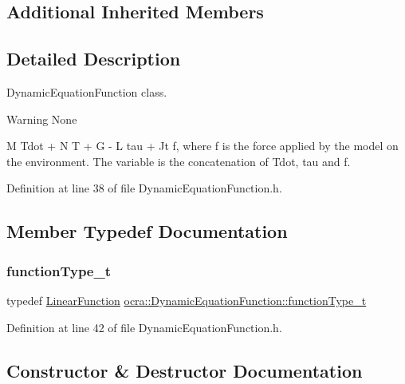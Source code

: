 \subsection*{Additional Inherited Members}


\subsection{Detailed Description}
Dynamic\+Equation\+Function class. 

\begin{DoxyWarning}{Warning}
None
\end{DoxyWarning}
M Tdot + N T + G -\/ L tau + Jt f, where f is the force applied by the model on the environment. The variable is the concatenation of Tdot, tau and f. 

Definition at line 38 of file Dynamic\+Equation\+Function.\+h.



\subsection{Member Typedef Documentation}
\hypertarget{classocra_1_1DynamicEquationFunction_a2c8c76bfd66285d63895ec34219175b4}{}\label{classocra_1_1DynamicEquationFunction_a2c8c76bfd66285d63895ec34219175b4} 
\subsubsection{\texorpdfstring{function\+Type\+\_\+t}{functionType\_t}}
{\footnotesize\ttfamily typedef \hyperlink{classocra_1_1LinearFunction}{Linear\+Function} \hyperlink{classocra_1_1DynamicEquationFunction_a2c8c76bfd66285d63895ec34219175b4}{ocra\+::\+Dynamic\+Equation\+Function\+::function\+Type\+\_\+t}}



Definition at line 42 of file Dynamic\+Equation\+Function.\+h.



\subsection{Constructor \& Destructor Documentation}
\hypertarget{classocra_1_1DynamicEquationFunction_ab6a38098b1aac7db298e0f3a93955624}{}\label{classocra_1_1DynamicEquationFunction_ab6a38098b1aac7db298e0f3a93955624} 
